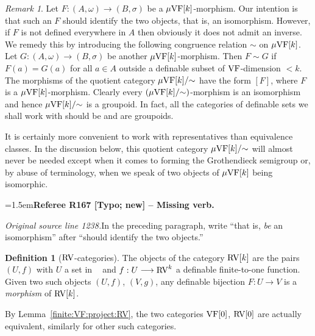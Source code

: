 \documentclass[12pt]{amsart}
\newcommand{\RefereeRemark}[4]{%
  \par\medskip\begingroup\normalfont\small\color{RefereePurple}%
  \emergencystretch=1.5em\noindent\textbf{Referee R#1 [#2] -- #3.}\par\nobreak\noindent #4\par
  \endgroup\medskip
}
\newcommand{\memph}[1]{{\color{magenta}\emph{#1}}}
\theoremstyle{plain}
\theoremstyle{definition}
\newtheorem{defn}[thm]{Definition}
\theoremstyle{remark}
\newtheorem{rem}[thm]{Remark}
\numberwithin{equation}{section}
\theoremstyle{plain}
\newcommand{\VF}{\textup{VF}}
\newcommand{\RV}{\textup{RV}}
\newcommand{\0}{\emptyset}
\newcommand{\fun}{\longrightarrow}
\newcommand{\mgVF}{{\mu} {\VF}}
\DeclareMathOperator{\RVV}{RV_\infty}
\begin{document}
\begin{rem}\label{mor:equi}
Let $F : (A, \omega) \fun (B, \sigma)$ be a $\mgVF[k]$-morphism. Our intention is that such an $F$ should identify the two objects, that is, an isomorphism. However, if $F$ is not defined everywhere in $A$ then obviously it does not admit an inverse. We remedy this by introducing the following congruence relation $\sim$ on $\mgVF[k]$. Let $G : (A, \omega) \fun (B, \sigma)$ be another $\mgVF[k]$-morphism. Then $F \sim G$ if $F(a) = G(a)$ for all $a \in A$  outside a definable subset  of $\VF$-dimension $< k$. The morphisms of the quotient category $\mgVF[k] /{\sim}$ have the form $[F]$, where $F$ is a $\mgVF[k]$-morphism. Clearly every $(\mgVF[k] / {\sim})$-morphism is an isomorphism and hence $\mgVF[k] / {\sim}$ is a groupoid. In fact, all the categories of definable sets we shall work with should be and are groupoids.

It is certainly more convenient to work with representatives than equivalence classes. In the discussion below, this quotient category $\mgVF[k] /{\sim}$ will almost never be needed except when it comes to forming the Grothendieck semigroup or, by abuse of terminology, when we speak of two objects of $\mgVF[k]$ being isomorphic.

\RefereeRemark{167}{Typo; new}{Missing verb}{%
\textit{Original source line 1238.}\quad In the preceding paragraph, write ``that is, \emph{be} an isomorphism'' after ``should identify the two objects.''
}
\end{rem}



\begin{defn}[$\RV$-categories]\label{defn:c:RV:cat}
The objects of the category $\RV[k]$ are the pairs $(U, f)$ with $U$ a set in $\RVV$ and $f : U \fun \RV^k$ a definable finite-to-one function. Given two such objects $(U, f)$, $(V, g)$, any definable bijection $F : U \fun V$ is a \memph{morphism} of $\RV[k]$.
\end{defn}

By Lemma~\ref{finite:VF:project:RV}, the two categories $\VF[0]$, $\RV[0]$ are actually equivalent, similarly for other such categories.
\end{document}
